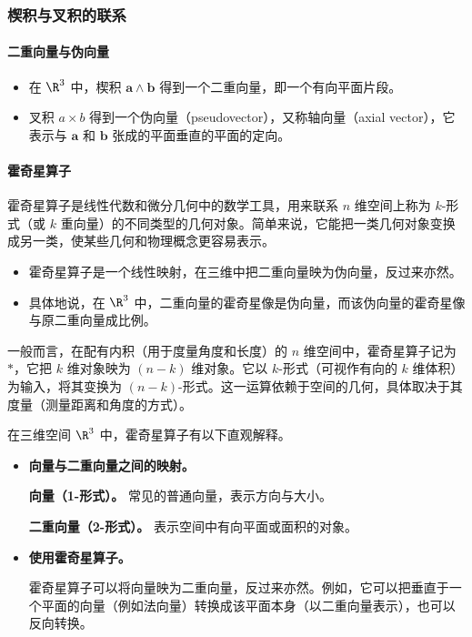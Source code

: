 \subsubsection{楔积与叉积的联系}
\paragraph{二重向量与伪向量}
\begin{itemize}
\item 在 $\R^3$ 中，楔积 $\symbf{a}\wedge\symbf{b}$ 得到一个二重向量，即一个有向平面片段。
\item 叉积 $a\times b$ 得到一个伪向量（pseudovector），又称轴向量（axial vector），它表示与 $\symbf{a}$ 和 $\symbf{b}$ 张成的平面垂直的平面的定向。%
\end{itemize}

\paragraph{霍奇星算子}
霍奇星算子是线性代数和微分几何中的数学工具，用来联系 $n$ 维空间上称为 $k$-形式（或 $k$ 重向量）的不同类型的几何对象。简单来说，它能把一类几何对象变换成另一类，使某些几何和物理概念更容易表示。
\begin{itemize}
\item 霍奇星算子是一个线性映射，在三维中把二重向量映为伪向量，反过来亦然。
\item 具体地说，在 $\R^3$ 中，二重向量的霍奇星像是伪向量，而该伪向量的霍奇星像与原二重向量成比例。
\end{itemize}

一般而言，在配有内积（用于度量角度和长度）的 $n$ 维空间中，霍奇星算子记为 $*$，它把 $k$ 维对象映为 $(n-k)$ 维对象。它以 $k$-形式（可视作有向的 $k$ 维体积）为输入，将其变换为 $(n-k)$-形式。这一运算依赖于空间的几何，具体取决于其度量（测量距离和角度的方式）。

在三维空间 $\R^3$ 中，霍奇星算子有以下直观解释。
\begin{itemize}
\item \textbf{向量与二重向量之间的映射。}

\textbf{向量（1-形式）。} 常见的普通向量，表示方向与大小。

\textbf{二重向量（2-形式）。} 表示空间中有向平面或面积的对象。
\item \textbf{使用霍奇星算子。}

霍奇星算子可以将向量映为二重向量，反过来亦然。例如，它可以把垂直于一个平面的向量（例如法向量）转换成该平面本身（以二重向量表示），也可以反向转换。
\end{itemize}

